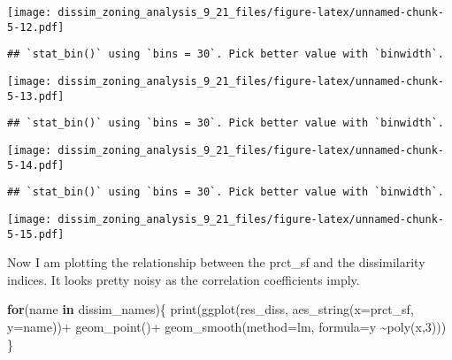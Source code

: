 \documentclass[
]{article}
\newenvironment{Shaded}{\begin{snugshade}}{\end{snugshade}}
\newcommand{\AttributeTok}[1]{\textcolor[rgb]{0.77,0.63,0.00}{#1}}
\newcommand{\ControlFlowTok}[1]{\textcolor[rgb]{0.13,0.29,0.53}{\textbf{#1}}}
\newcommand{\FunctionTok}[1]{\textcolor[rgb]{0.00,0.00,0.00}{#1}}
\newcommand{\NormalTok}[1]{#1}
\newcommand{\SpecialCharTok}[1]{\textcolor[rgb]{0.00,0.00,0.00}{#1}}
\newcommand{\StringTok}[1]{\textcolor[rgb]{0.31,0.60,0.02}{#1}}
\begin{document}
\texttt{[image: dissim\_zoning\_analysis\_9\_21\_files/figure-latex/unnamed-chunk-5-12.pdf]}

\begin{verbatim}
## `stat_bin()` using `bins = 30`. Pick better value with `binwidth`.
\end{verbatim}

\texttt{[image: dissim\_zoning\_analysis\_9\_21\_files/figure-latex/unnamed-chunk-5-13.pdf]}

\begin{verbatim}
## `stat_bin()` using `bins = 30`. Pick better value with `binwidth`.
\end{verbatim}

\texttt{[image: dissim\_zoning\_analysis\_9\_21\_files/figure-latex/unnamed-chunk-5-14.pdf]}

\begin{verbatim}
## `stat_bin()` using `bins = 30`. Pick better value with `binwidth`.
\end{verbatim}

\texttt{[image: dissim\_zoning\_analysis\_9\_21\_files/figure-latex/unnamed-chunk-5-15.pdf]}

Now I am plotting the relationship between the prct\_sf and the
dissimilarity indices. It looks pretty noisy as the correlation
coefficients imply.

\begin{Shaded}
\begin{Highlighting}[]
\ControlFlowTok{for}\NormalTok{(name }\ControlFlowTok{in}\NormalTok{ dissim\_names)\{}
\FunctionTok{print}\NormalTok{(}\FunctionTok{ggplot}\NormalTok{(res\_diss, }\FunctionTok{aes\_string}\NormalTok{(}\AttributeTok{x=}\StringTok{\textquotesingle{}prct\_sf\textquotesingle{}}\NormalTok{, }\AttributeTok{y=}\NormalTok{name))}\SpecialCharTok{+}
  \FunctionTok{geom\_point}\NormalTok{()}\SpecialCharTok{+}
  \FunctionTok{geom\_smooth}\NormalTok{(}\AttributeTok{method=}\NormalTok{lm, }\AttributeTok{formula=}\StringTok{\textquotesingle{}y \textasciitilde{}poly(x,3)\textquotesingle{}}\NormalTok{))}
\NormalTok{\}}
\end{Highlighting}
\end{Shaded}
\end{document}
